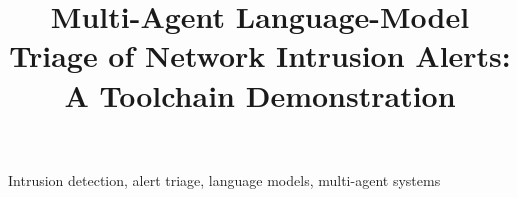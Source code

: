 \documentclass[conference]{IEEEtran}
\begin{document}
\title{Multi-Agent Language-Model Triage of Network Intrusion Alerts: A Toolchain Demonstration}

\author{
}

\maketitle

\begin{abstract}

\end{abstract}

\begin{IEEEkeywords}
Intrusion detection, alert triage, language models, multi-agent systems
\end{IEEEkeywords}



\makeatletter\let\@noitemerr\relax\makeatother


\end{document}
